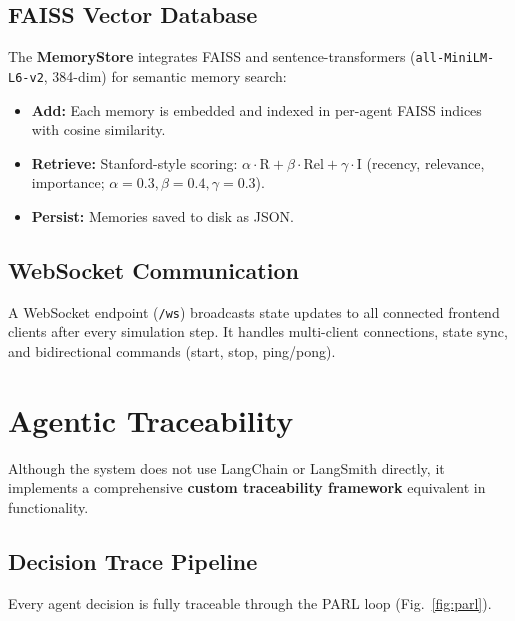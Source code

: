 \documentclass[conference]{IEEEtran}
\begin{document}
\subsection{FAISS Vector Database}

The \textbf{MemoryStore} integrates FAISS and sentence-transformers (\texttt{all-MiniLM-L6-v2}, 384-dim) for semantic memory search:

\begin{itemize}
    \item \textbf{Add:} Each memory is embedded and indexed in per-agent FAISS indices with cosine similarity.
    \item \textbf{Retrieve:} Stanford-style scoring: $\alpha{\cdot}\text{R} + \beta{\cdot}\text{Rel} + \gamma{\cdot}\text{I}$ (recency, relevance, importance; $\alpha{=}0.3, \beta{=}0.4, \gamma{=}0.3$).
    \item \textbf{Persist:} Memories saved to disk as JSON.
\end{itemize}

\subsection{WebSocket Communication}

A WebSocket endpoint (\texttt{/ws}) broadcasts state updates to all connected frontend clients after every simulation step. It handles multi-client connections, state sync, and bidirectional commands (start, stop, ping/pong).

\section{Agentic Traceability}

Although the system does not use LangChain or LangSmith directly, it implements a comprehensive \textbf{custom traceability framework} equivalent in functionality.

\subsection{Decision Trace Pipeline}

Every agent decision is fully traceable through the PARL loop (Fig.~\ref{fig:parl}).
\end{document}
